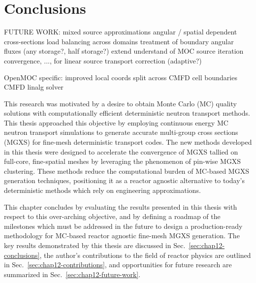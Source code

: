 \chapter{Conclusions}
\label{chap:conclusions-future-work}

FUTURE WORK:
mixed source approximations
angular / spatial dependent cross-sections
load balancing across domains
treatment of boundary angular fluxes (any storage?, half storage?)
extend understand of MOC source iteration convergence, ..., for linear source
transport correction (adaptive?)

OpenMOC specific:
improved local coords
split across CMFD cell boundaries
CMFD linalg solver


This research was motivated by a desire to obtain Monte Carlo (MC) quality solutions with computationally efficient deterministic neutron transport methods. This thesis approached this objective by employing continuous energy \ac{MC} neutron transport simulations to generate accurate  multi-group cross sections (MGXS) for fine-mesh deterministic transport codes. The new methods developed in this thesis were designed to accelerate the convergence of \ac{MGXS} tallied on full-core, fine-spatial meshes by leveraging the phenomenon of pin-wise \ac{MGXS} clustering. These methods reduce the computational burden of \ac{MC}-based \ac{MGXS} generation techniques, positioning it as a reactor agnostic alternative to today's deterministic methods which rely on engineering approximations.

This chapter concludes by evaluating the results presented in this thesis with respect to this over-arching objective, and by defining a roadmap of the milestones which must be addressed in the future to design a production-ready methodology for \ac{MC}-based reactor agnostic fine-mesh \ac{MGXS} generation. The key results demonstrated by this thesis are discussed in Sec.~\ref{sec:chap12-conclusions}, the author's contributions to the field of reactor physics are outlined in Sec.~\ref{sec:chap12-contributions}, and opportunities for future research are summarized in Sec.~\ref{sec:chap12-future-work}.


